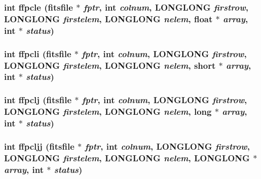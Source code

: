 \subsubsection{\setlength{\rightskip}{0pt plus 5cm}int ffpcle (\bf{fitsfile} $\ast$ {\em fptr}, int {\em colnum}, \bf{LONGLONG} {\em firstrow}, \bf{LONGLONG} {\em firstelem}, \bf{LONGLONG} {\em nelem}, float $\ast$ {\em array}, int $\ast$ {\em status})}\label{test_2roimasker_2fitsio_8h_2af80b40c939d1d21b4da19e8999421c}


\subsubsection{\setlength{\rightskip}{0pt plus 5cm}int ffpcli (\bf{fitsfile} $\ast$ {\em fptr}, int {\em colnum}, \bf{LONGLONG} {\em firstrow}, \bf{LONGLONG} {\em firstelem}, \bf{LONGLONG} {\em nelem}, short $\ast$ {\em array}, int $\ast$ {\em status})}\label{test_2roimasker_2fitsio_8h_097003985cb9d02ceced5a5744bfa0fc}


\subsubsection{\setlength{\rightskip}{0pt plus 5cm}int ffpclj (\bf{fitsfile} $\ast$ {\em fptr}, int {\em colnum}, \bf{LONGLONG} {\em firstrow}, \bf{LONGLONG} {\em firstelem}, \bf{LONGLONG} {\em nelem}, long $\ast$ {\em array}, int $\ast$ {\em status})}\label{test_2roimasker_2fitsio_8h_5792d2cdff6869df24d96769d29588bb}


\subsubsection{\setlength{\rightskip}{0pt plus 5cm}int ffpcljj (\bf{fitsfile} $\ast$ {\em fptr}, int {\em colnum}, \bf{LONGLONG} {\em firstrow}, \bf{LONGLONG} {\em firstelem}, \bf{LONGLONG} {\em nelem}, \bf{LONGLONG} $\ast$ {\em array}, int $\ast$ {\em status})}\label{test_2roimasker_2fitsio_8h_65ee3dc7c6f9893ec471ba73d3a9779d}


